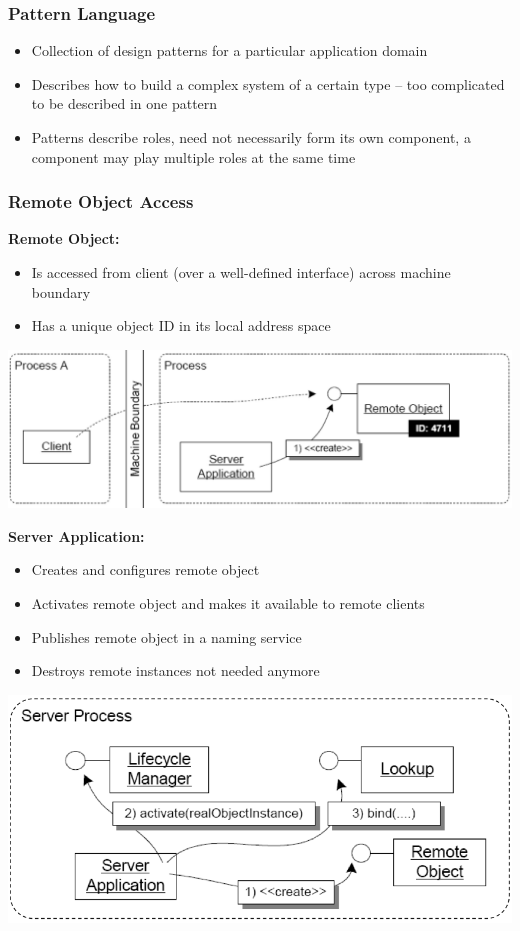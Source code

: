 \documentclass[10pt]{article}
\begin{document}
\subsubsection{Pattern Language}
\begin{itemize}
	\item Collection of design patterns for a particular application domain
	\item Describes how to build a complex system of a certain type -- too complicated to be described in one pattern
	\item Patterns describe roles, need not necessarily form its own component, a component may play multiple roles at the same time
\end{itemize}
\subsubsection{Remote Object Access}
\textbf{Remote Object:}
\begin{itemize}
	\item Is accessed from client (over a well-defined interface) across machine boundary
	\item Has a unique object ID in its local address space
\end{itemize}
\begin{center}
	\includegraphics[scale=0.2]{images/remote-objects.png}
\end{center}
\textbf{Server Application:}
\begin{itemize}
	\item Creates and configures remote object
	\item Activates remote object and makes it available to remote clients
	\item Publishes remote object in a naming service
	\item Destroys remote instances not needed anymore
\end{itemize}
\begin{center}
	\includegraphics[scale=0.2]{images/server-application.png}
\end{center}
\end{document}
